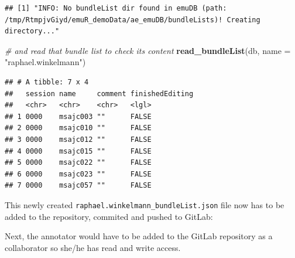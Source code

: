 \documentclass[]{book}
\newenvironment{Shaded}{\begin{snugshade}}{\end{snugshade}}
\newcommand{\CommentTok}[1]{\textcolor[rgb]{0.56,0.35,0.01}{\textit{#1}}}
\newcommand{\DataTypeTok}[1]{\textcolor[rgb]{0.13,0.29,0.53}{#1}}
\newcommand{\KeywordTok}[1]{\textcolor[rgb]{0.13,0.29,0.53}{\textbf{#1}}}
\newcommand{\NormalTok}[1]{#1}
\newcommand{\OperatorTok}[1]{\textcolor[rgb]{0.81,0.36,0.00}{\textbf{#1}}}
\newcommand{\StringTok}[1]{\textcolor[rgb]{0.31,0.60,0.02}{#1}}
\begin{document}
\begin{verbatim}
## [1] "INFO: No bundleList dir found in emuDB (path: /tmp/RtmpjvGiyd/emuR_demoData/ae_emuDB/bundleLists)! Creating directory..."
\end{verbatim}

\begin{Shaded}
\begin{Highlighting}[]
\CommentTok{# and read that bundle list to check its content}
\KeywordTok{read_bundleList}\NormalTok{(db, }
                \DataTypeTok{name =} \StringTok{"raphael.winkelmann"}\NormalTok{)}
\end{Highlighting}
\end{Shaded}

\begin{verbatim}
## # A tibble: 7 x 4
##   session name     comment finishedEditing
##   <chr>   <chr>    <chr>   <lgl>          
## 1 0000    msajc003 ""      FALSE          
## 2 0000    msajc010 ""      FALSE          
## 3 0000    msajc012 ""      FALSE          
## 4 0000    msajc015 ""      FALSE          
## 5 0000    msajc022 ""      FALSE          
## 6 0000    msajc023 ""      FALSE          
## 7 0000    msajc057 ""      FALSE
\end{verbatim}

This newly created \texttt{raphael.winkelmann\_bundleList.json} file now has to be added to the repository, commited and pushed to GitLab:

\begin{Shaded}
\end{Shaded}

Next, the annotator would have to be added to the GitLab repository as a collaborator so she/he has read and write access.
\end{document}
